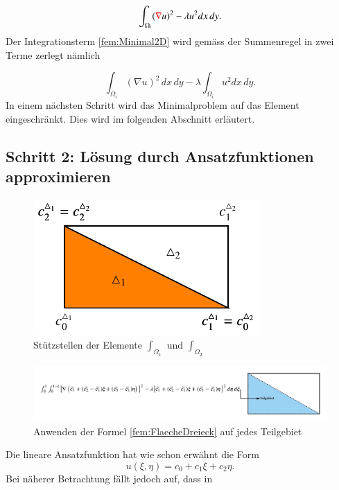 \begin{equation}
\int_{\Omega_i} ({\color{red}\nabla} u)^2 - \lambda u^2 dx \, dy.
\label{fem:Minimal2D}
\end{equation}
Der Integrationsterm \eqref{fem:Minimal2D} wird gemäss der Summenregel in zwei Terme zerlegt nämlich 

\begin{equation}
\int_{\Omega_i} (\nabla u)^2 \, dx \, dy - \lambda \int_{\Omega_i} u^2 dx \, dy.
\label{fem:Minimal2D2Term}
\end{equation}
In einem nächsten Schritt wird das Minimalproblem auf das Element eingeschränkt.
Dies wird im folgenden Abschnitt erläutert.

\subsection{Schritt 2: Lösung durch Ansatzfunktionen approximieren}
\begin{figure}
\centering
\includegraphics{papers/fem/Images/bild4711.pdf}
\caption{Stützstellen der Elemente $\int_{\Omega_1}$ und $\int_{\Omega_2}$ }
\label{fem:Stuestellen}
\end{figure} 
\begin{figure}
\centering
\includegraphics[scale=0.6]{papers/fem/Images/FoTeilgebiet.jpeg}
\caption{Anwenden der Formel \eqref{fem:FlaecheDreieck} auf jedes Teilgebiet}
\label{fig:schemNMR_vorlage}
\end{figure}
Die lineare Ansatzfunktion hat wie schon erwähnt die Form
\begin{equation}
u(\xi, \eta) = c_0 + c_1 \xi + c_2 \eta.
\label{fem:equationSchwarzLinear}
\end{equation}
Bei näherer Betrachtung fällt jedoch auf, dass in

